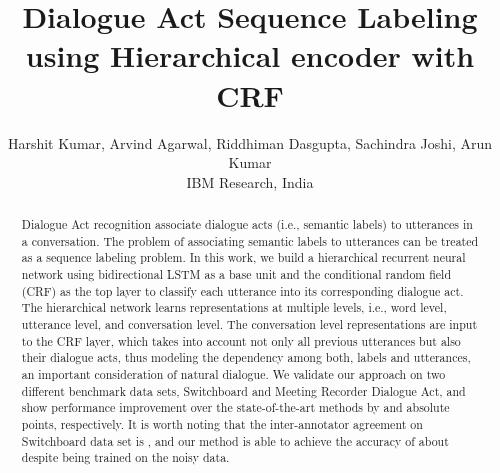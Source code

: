 \documentclass[letterpaper]{article} \usepackage{aaai18}
\title{Dialogue Act Sequence Labeling using Hierarchical encoder with CRF}
\author{
 	Harshit Kumar, Arvind Agarwal, Riddhiman Dasgupta, Sachindra Joshi, Arun Kumar\\
 	IBM Research, India
 }
\begin{document}
\maketitle
\begin{abstract}
Dialogue Act recognition associate dialogue acts (i.e., semantic labels) to utterances in a conversation. The problem of associating semantic labels to utterances can be treated as a sequence labeling problem. In this work, we build a hierarchical recurrent neural network using bidirectional LSTM as a base unit and the conditional random field (CRF) as the top layer to classify each utterance into its corresponding dialogue act. The hierarchical network learns representations at multiple levels, i.e., word level, utterance level, and conversation level. The conversation level representations are input to the CRF layer, which takes into account not only all previous utterances but also their dialogue acts, thus modeling the dependency among both, labels and utterances, an important consideration of natural dialogue. We validate our approach on two different benchmark data sets, Switchboard and Meeting Recorder Dialogue Act, and show performance improvement over the state-of-the-art methods by  and  absolute points, respectively. It is worth noting that the inter-annotator agreement on Switchboard data set is , and our method is able to achieve the accuracy of about  despite being trained on the noisy data. 
\end{abstract}
\end{document}
